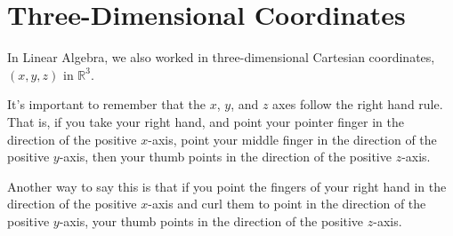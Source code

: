 \documentclass{ximera}
\begin{document}
\section{Three-Dimensional Coordinates}

In Linear Algebra, we also worked in three-dimensional Cartesian coordinates, $(x,y,z)$ in $\mathbb{R}^3$.

\begin{image}
\end{image}

It's important to remember that the $x$, $y$, and $z$ axes follow the right hand rule. That is, if you take your right hand, and point your pointer finger in the direction of the positive $x$-axis, point your middle finger in the direction of the positive $y$-axis, then your thumb points in the direction of the positive $z$-axis.

Another way to say this is that if you point the fingers of your right hand in the direction of the positive $x$-axis and curl them to point in the direction of the positive $y$-axis, your thumb points in the direction of the positive $z$-axis.
\end{document}
